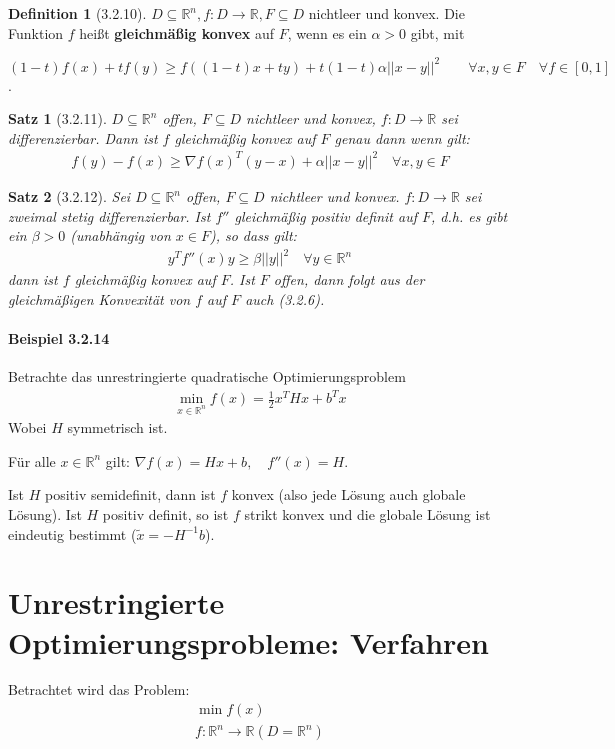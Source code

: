 \documentclass[ngerman,halfparskip]{scrartcl}
\newtheorem*{satz}{Satz}
\theoremstyle{definition}
\newtheorem*{defin}{Definition}
\def\R{\mathbb R}
\begin{document}
\begin{defin}[3.2.10]
$D\subseteq\R^n, f:D\rightarrow\R, F\subseteq D$ nichtleer und konvex. Die Funktion $f$ heißt \textbf{gleichmäßig konvex} auf $F$, wenn es ein $\alpha > 0$ gibt, mit 

$(1-t)f(x)+tf(y)\geq f((1-t)x+ty)+t(1-t)\alpha ||x-y||^2 \qquad\forall x,y \in F \quad \forall f \in [0,1]$.
\end{defin}

\begin{satz}[3.2.11]
$D\subseteq\R^n$ offen, $F\subseteq D$ nichtleer und konvex, $f:D\rightarrow\R$ sei differenzierbar. Dann ist $f$ gleichmäßig konvex auf $F$ genau dann wenn gilt:
\begin{gather}\tag{3.2.5}
f(y)-f(x)\geq \nabla f (x)^T(y-x)+\alpha||x-y||^2 \quad \forall x,y\in F
\end{gather}
\end{satz}

\begin{satz}[3.2.12]
Sei $D\subseteq \R^n$ offen, $F\subseteq D$ nichtleer und konvex.  $f:D\rightarrow\R$ sei zweimal stetig differenzierbar. Ist $f''$ gleichmäßig positiv definit auf $F$, d.h. es gibt ein $\beta >0$ (unabhängig von $x\in F$), so dass gilt:
\begin{gather}\tag{3.2.6}
y^Tf''(x)y\geq \beta ||y||^2\quad \forall y\in\R^n
\end{gather}
dann ist $f$ gleichmäßig konvex auf $F$. Ist $F$ offen, dann folgt aus der gleichmäßigen Konvexität von $f$ auf $F$ auch (3.2.6).
\end{satz}
\paragraph{Beispiel 3.2.14}
Betrachte das unrestringierte quadratische Optimierungsproblem \begin{gather*}\tag{QU}
\min\limits_{x\in\R^n}f(x)=\frac 12x^THx+b^Tx
\end{gather*}
Wobei $H$ symmetrisch ist. 

Für alle $x\in \R^n$ gilt: $\nabla f(x)=Hx+b, \quad f''(x)=H$.

Ist $H$ positiv semidefinit, dann ist $f$ konvex (also jede Lösung auch globale Lösung). Ist $H$ positiv definit, so ist $f$ strikt konvex und die globale Lösung ist eindeutig bestimmt ($\tilde x=-H^{-1}b$). 


\section{Unrestringierte Optimierungsprobleme: Verfahren}
Betrachtet wird das Problem:
\begin{gather*}\tag{PU}
\min f(x)\\
f:\R^n\rightarrow \R (D=\R^n)
\end{gather*}
\end{document}
